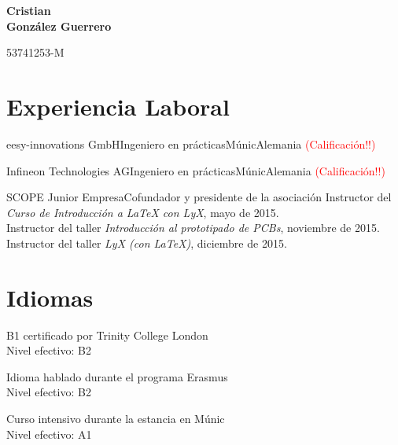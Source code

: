 \documentclass[11pt,a4paper,sans,spanish]{moderncv}
\begin{document}
\begin{minipage}[c]{\textwidth-110pt-0.5em}
    \begin{flushright}
        \textbf{\Huge{Cristian\\\vspace{4pt}González Guerrero}}

        \vspace{4pt}
        \small{53741253-M}
    \end{flushright}
\end{minipage}
\vspace{-5em}

\makecvtitle

\section{Experiencia Laboral}

{eesy-innovations GmbH}{Ingeniero en prácticas}{Múnic}{Alemania}
{\textcolor{red}{(Calificación!!)}}

{Infineon Technologies AG}{Ingeniero en prácticas}{Múnic}{Alemania}
{\textcolor{red}{(Calificación!!)}}

{SCOPE Junior Empresa}{Cofundador y presidente de la asociación}{}{}
{Instructor del \emph{Curso de Introducción a LaTeX con LyX}, mayo de 2015.\\
Instructor del taller \emph{Introducción al prototipado de PCBs}, noviembre de 2015.\\
Instructor del taller \emph{LyX (con LaTeX)}, diciembre de 2015.}


\section{Idiomas}


{B1 certificado por Trinity College London\\Nivel efectivo: B2}

{Idioma hablado durante el programa Erasmus\\Nivel efectivo: B2}

{Curso intensivo durante la estancia en Múnic\\Nivel efectivo: A1} 
\end{document}
